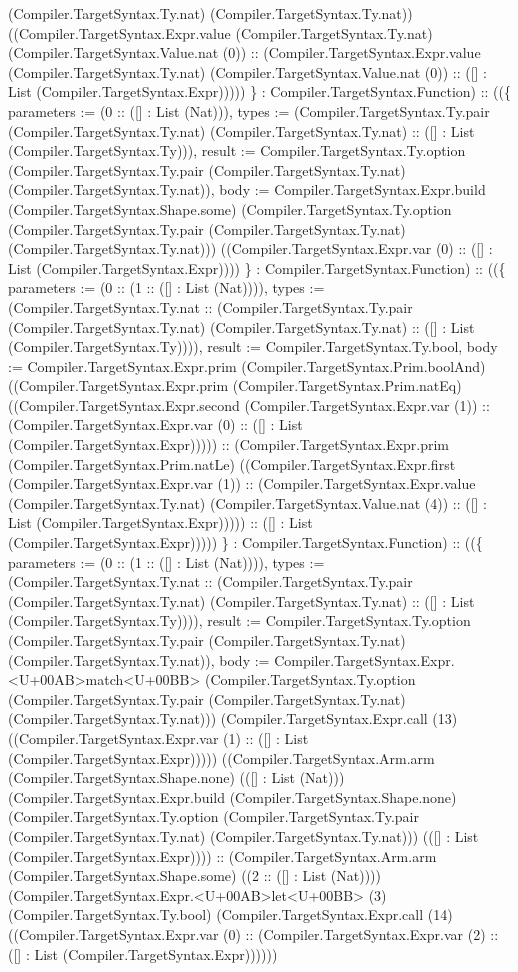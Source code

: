 \documentclass[11pt]{article}
\begin{document}
(Compiler.TargetSyntax.Ty.nat) (Compiler.TargetSyntax.Ty.nat)) ((Compiler.TargetSyntax.Expr.value (Compiler.TargetSyntax.Ty.nat) (Compiler.TargetSyntax.Value.nat (0)) :: (Compiler.TargetSyntax.Expr.value (Compiler.TargetSyntax.Ty.nat) (Compiler.TargetSyntax.Value.nat (0)) :: ([] : List (Compiler.TargetSyntax.Expr))))) \} : Compiler.TargetSyntax.Function) :: ((\{ parameters := (0 :: ([] : List (Nat))), types := (Compiler.TargetSyntax.Ty.pair (Compiler.TargetSyntax.Ty.nat) (Compiler.TargetSyntax.Ty.nat) :: ([] : List (Compiler.TargetSyntax.Ty))), result := Compiler.TargetSyntax.Ty.option (Compiler.TargetSyntax.Ty.pair (Compiler.TargetSyntax.Ty.nat) (Compiler.TargetSyntax.Ty.nat)), body := Compiler.TargetSyntax.Expr.build (Compiler.TargetSyntax.Shape.some) (Compiler.TargetSyntax.Ty.option (Compiler.TargetSyntax.Ty.pair (Compiler.TargetSyntax.Ty.nat) (Compiler.TargetSyntax.Ty.nat))) ((Compiler.TargetSyntax.Expr.var (0) :: ([] : List (Compiler.TargetSyntax.Expr)))) \} : Compiler.TargetSyntax.Function) :: ((\{ parameters := (0 :: (1 :: ([] : List (Nat)))), types := (Compiler.TargetSyntax.Ty.nat :: (Compiler.TargetSyntax.Ty.pair (Compiler.TargetSyntax.Ty.nat) (Compiler.TargetSyntax.Ty.nat) :: ([] : List (Compiler.TargetSyntax.Ty)))), result := Compiler.TargetSyntax.Ty.bool, body := Compiler.TargetSyntax.Expr.prim (Compiler.TargetSyntax.Prim.boolAnd) ((Compiler.TargetSyntax.Expr.prim (Compiler.TargetSyntax.Prim.natEq) ((Compiler.TargetSyntax.Expr.second (Compiler.TargetSyntax.Expr.var (1)) :: (Compiler.TargetSyntax.Expr.var (0) :: ([] : List (Compiler.TargetSyntax.Expr))))) :: (Compiler.TargetSyntax.Expr.prim (Compiler.TargetSyntax.Prim.natLe) ((Compiler.TargetSyntax.Expr.first (Compiler.TargetSyntax.Expr.var (1)) :: (Compiler.TargetSyntax.Expr.value (Compiler.TargetSyntax.Ty.nat) (Compiler.TargetSyntax.Value.nat (4)) :: ([] : List (Compiler.TargetSyntax.Expr))))) :: ([] : List (Compiler.TargetSyntax.Expr))))) \} : Compiler.TargetSyntax.Function) :: ((\{ parameters := (0 :: (1 :: ([] : List (Nat)))), types := (Compiler.TargetSyntax.Ty.nat :: (Compiler.TargetSyntax.Ty.pair (Compiler.TargetSyntax.Ty.nat) (Compiler.TargetSyntax.Ty.nat) :: ([] : List (Compiler.TargetSyntax.Ty)))), result := Compiler.TargetSyntax.Ty.option (Compiler.TargetSyntax.Ty.pair (Compiler.TargetSyntax.Ty.nat) (Compiler.TargetSyntax.Ty.nat)), body := Compiler.TargetSyntax.Expr.<U+00AB>match<U+00BB> (Compiler.TargetSyntax.Ty.option (Compiler.TargetSyntax.Ty.pair (Compiler.TargetSyntax.Ty.nat) (Compiler.TargetSyntax.Ty.nat))) (Compiler.TargetSyntax.Expr.call (13) ((Compiler.TargetSyntax.Expr.var (1) :: ([] : List (Compiler.TargetSyntax.Expr))))) ((Compiler.TargetSyntax.Arm.arm (Compiler.TargetSyntax.Shape.none) (([] : List (Nat))) (Compiler.TargetSyntax.Expr.build (Compiler.TargetSyntax.Shape.none) (Compiler.TargetSyntax.Ty.option (Compiler.TargetSyntax.Ty.pair (Compiler.TargetSyntax.Ty.nat) (Compiler.TargetSyntax.Ty.nat))) (([] : List (Compiler.TargetSyntax.Expr)))) :: (Compiler.TargetSyntax.Arm.arm (Compiler.TargetSyntax.Shape.some) ((2 :: ([] : List (Nat)))) (Compiler.TargetSyntax.Expr.<U+00AB>let<U+00BB> (3) (Compiler.TargetSyntax.Ty.bool) (Compiler.TargetSyntax.Expr.call (14) ((Compiler.TargetSyntax.Expr.var (0) :: (Compiler.TargetSyntax.Expr.var (2) :: ([] : List (Compiler.TargetSyntax.Expr)))))) 
\end{document}
